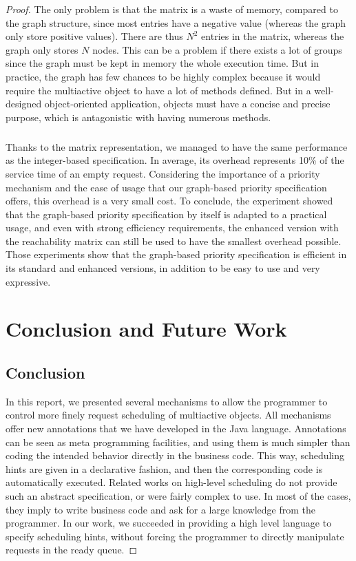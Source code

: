 \documentclass[11pt]{report}
\begin{document}
\begin{proof}
The only problem is that the matrix is a waste of memory, compared to the graph structure, since most entries have a negative value (whereas the graph only store positive values). There are thus $N^2$ entries in the matrix, whereas the graph only stores $N$ nodes. This can be a problem if there exists a lot of groups since the graph must be kept in memory the whole execution time.
But in practice, the graph has few chances to be highly complex because it would require the multiactive object to have a lot of methods defined. But in a well-designed object-oriented application, objects must have a concise and precise purpose, which is antagonistic with having numerous methods. 

\paragraph{}
Thanks to the matrix representation, we managed to have the same performance as the integer-based specification. In average, its overhead represents 10\% of the service time of an empty request. Considering the importance of a priority mechanism and the ease of usage that our graph-based priority specification offers, this overhead is a very small cost. 
To conclude, the experiment showed that the graph-based priority specification by itself is adapted to a practical usage, and even with strong efficiency requirements, the enhanced version with the reachability matrix can still be used to have the smallest overhead possible. Those experiments show that the graph-based priority specification is efficient in its standard and enhanced versions, in addition to be easy to use and very expressive. 

\chapter{Conclusion and Future Work} 
\section{Conclusion}
In this report, we presented several mechanisms to allow the programmer to control more finely request scheduling of multiactive objects. All mechanisms offer new annotations that we have developed in the Java language. Annotations can be seen as meta programming facilities, and using them is much simpler than coding the intended behavior directly in the business code. This way, scheduling hints are given in a declarative fashion, and then the corresponding code is automatically executed. Related works on high-level scheduling do not provide such an abstract specification, or were fairly complex to use. In most of the cases, they imply to write business code and ask for a large knowledge from the programmer. In our work, we succeeded in providing a high level language to specify scheduling hints, without forcing the programmer to directly manipulate requests in the ready queue.


\end{proof}
\end{document}
